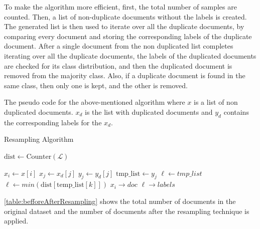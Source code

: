To make the algorithm more efficient, first, the total number of samples are counted. Then, a list of non-duplicate documents without the labels is created. The generated list is then used to iterate over all the duplicate documents, by comparing every document and storing the corresponding labels of the duplicate document. After a single document from the non duplicated list completes iterating over all the duplicate documents, the labels of the duplicated documents are checked for its class distribution, and then the duplicated document is removed from the majority class. Also, if a duplicate document is found in the same class, then only one is kept, and the other is removed.

The pseudo code for the above-mentioned algorithm where $x$ is a list of non duplicated documents. $x_{d}$ is the list with duplicated documents and $y_{d}$ contains the corresponding labels for the $x_{d}$. 

\begin{algorithm}
\caption{Resampling Algorithm}
\begin{algorithmic}[1]
    \STATE $\text{dist} \leftarrow \text{Counter}(\mathscr{L})$
\ENDFOR

    \STATE $x_{i} \leftarrow x[i]$
        \STATE $x_{j} \leftarrow x_{d}[j]$
        \STATE $y_{j} \leftarrow y_{d}[j]$
            \STATE $\text{tmp\_list} \leftarrow y_{j}$ 
         \ENDIF
    \ENDFOR
        \STATE $\ell \leftarrow tmp\_list$
    \ELSE
            \STATE $\ell \leftarrow min(\text{dist}[\text{temp\_list}[k]])$
        \ENDFOR
    \ENDIF
    \STATE $x_{i} \rightarrow doc$    
    \STATE $\ell \rightarrow \textit{labels}$ 
\ENDFOR
\end{algorithmic}
\end{algorithm}

\ref{table:befforeAfterResampling} shows the total number of documents in the original dataset and the number of documents after the resampling technique is applied.

